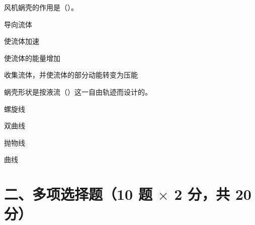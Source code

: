 \begin{ti}
\item 风机蜗壳的作用是（\quad）。
\begin{choices}
\item 导向流体
\item 使流体加速
\item 使流体的能量增加
\item 收集流体，并使流体的部分动能转变为压能
\end{choices}

\item 蜗壳形状是按液流（\quad）这一自由轨迹而设计的。
\begin{choices}
\item 螺旋线
\item 双曲线
\item 抛物线
\item 曲线
\end{choices}

\end{ti}

\section*{二、多项选择题（10 题 $\times$ 2 分，共 20 分）}

